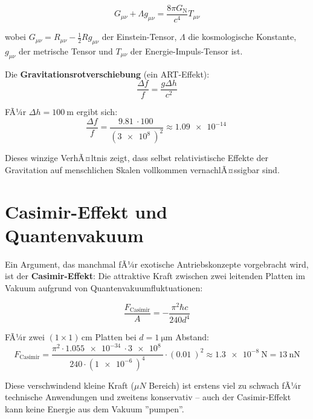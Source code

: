﻿\documentclass[12pt, a4paper]{report}
\theoremstyle{definition}
\theoremstyle{remark}
\newcommand{\G}{G_{\text{N}}}          %
\begin{document}
\begin{equation}
  G_{\mu\nu} + \Lambda g_{\mu\nu} = \frac{8\pi \G}{c^4} T_{\mu\nu}
  \label{eq:einstein_feld}
\end{equation}

wobei $G_{\mu\nu} = R_{\mu\nu} - \frac{1}{2}Rg_{\mu\nu}$ der Einstein-Tensor,
$\Lambda$ die kosmologische Konstante, $g_{\mu\nu}$ der metrische Tensor und
$T_{\mu\nu}$ der Energie-Impuls-Tensor ist.

Die \textbf{Gravitationsrotverschiebung} (ein ART-Effekt):
\begin{equation}
  \frac{\Delta f}{f} = \frac{g \Delta h}{c^2}
  \label{eq:rotverschiebung}
\end{equation}

FÃ¼r $\Delta h = \SI{100}{\metre}$ ergibt sich:
\begin{equation}
  \frac{\Delta f}{f} = \frac{\SI{9.81}{} \cdot \SI{100}{}}{(\SI{3e8}{})^2}
  \approx \SI{1.09e-14}{}
\end{equation}

Dieses winzige VerhÃ¤ltnis zeigt, dass selbst relativistische Effekte der
Gravitation auf menschlichen Skalen vollkommen vernachlÃ¤ssigbar sind.

\section{Casimir-Effekt und Quantenvakuum}

Ein Argument, das manchmal fÃ¼r exotische Antriebskonzepte vorgebracht wird,
ist der \textbf{Casimir-Effekt}: Die attraktive Kraft zwischen zwei leitenden
Platten im Vakuum aufgrund von Quantenvakuumfluktuationen:

\begin{equation}
  \frac{F_{\text{Casimir}}}{A} = -\frac{\pi^2 \hbar c}{240 d^4}
  \label{eq:casimir}
\end{equation}

FÃ¼r zwei $(1 \times 1)\,\si{\centi\metre}$ Platten bei $d = \SI{1}{\micro\metre}$ Abstand:
\begin{equation}
  F_{\text{Casimir}} = \frac{\pi^2 \cdot \SI{1.055e-34}{} \cdot \SI{3e8}{}}{240 \cdot (\SI{1e-6}{})^4}
  \cdot (\SI{0.01}{})^2 \approx \SI{1.3e-8}{\newton} = \SI{13}{\nano\newton}
\end{equation}

Diese verschwindend kleine Kraft ($\mu N$ Bereich) ist erstens viel zu schwach
fÃ¼r technische Anwendungen und zweitens konservativ -- auch der Casimir-Effekt
kann keine Energie aus dem Vakuum ''pumpen''.
\end{document}
